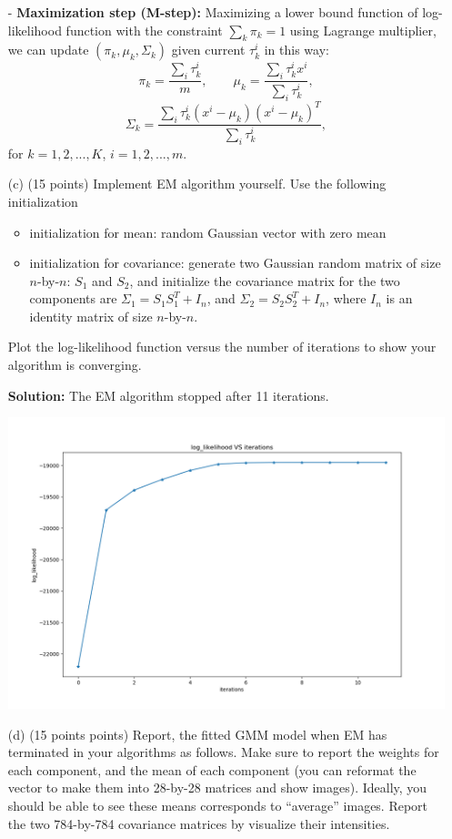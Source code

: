 \documentclass[twoside,12pt]{article}
\begin{document}
\begin{enumerate}
\begin{tcolorbox}
- \textbf{Maximization step (M-step):} Maximizing a lower bound function of log-likelihood function with the constraint $\sum_k \pi_k = 1$ using Lagrange multiplier, we can  update $(\pi_k, \mu_k, \Sigma_k)$ given current $\tau_k^i$ in this way:
$$\pi_k = \frac{\sum_i \tau_k^i}{m}, \quad\quad \mu_k = \frac{\sum_i \tau_k^i x^i}{\sum_i \tau_k^i},$$
$$\Sigma_k = \frac{\sum_i \tau_k^i (x^i - \mu_k)(x^i - \mu_k)^T}{\sum_i \tau_k^i},$$
for $k = 1, 2, ..., K$, $i = 1, 2, ..., m$.
 \end{tcolorbox}
 
\item[(c)] (15 points) Implement EM algorithm yourself. Use the following initialization
\begin{itemize}
\item initialization for mean: random Gaussian vector with zero mean
\item initialization for covariance: generate two Gaussian random matrix of size $n$-by-$n$: $S_1$ and $S_2$, and initialize the covariance matrix for the two components are $\Sigma_1 = S_1 S_1^T + I_n$, and  $\Sigma_2 = S_2 S_2^T + I_n$, where $I_n$ is an identity matrix of size $n$-by-$n$. 
\end{itemize}
Plot the log-likelihood function versus the number of iterations to show your algorithm is converging.
\begin{tcolorbox}
\textbf{Solution:} The EM algorithm stopped after 11 iterations. 
 \begin{center}
  \includegraphics[width=.8\textwidth]{log_likelihood.png}
    \end{center}
 \end{tcolorbox}

\item[(d)] (15 points points) Report, the fitted GMM model when EM has terminated in your algorithms as follows. Make sure to report the weights for each component, and the mean of each component (you can reformat the vector to make them into 28-by-28 matrices and show images). Ideally, you should be able to see these means corresponds to ``average'' images.  Report the two 784-by-784 covariance matrices by visualize their intensities. 


\end{enumerate}
\end{document}
